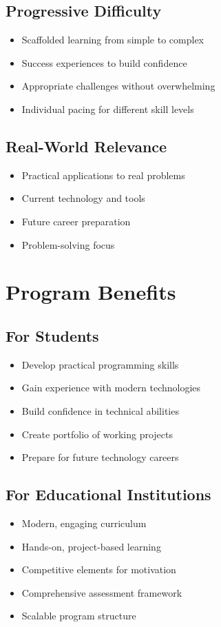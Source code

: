 \documentclass[12pt,a4paper]{article}
\begin{document}
\subsection{Progressive Difficulty}
\begin{itemize}
    \item Scaffolded learning from simple to complex
    \item Success experiences to build confidence
    \item Appropriate challenges without overwhelming
    \item Individual pacing for different skill levels
\end{itemize}

\subsection{Real-World Relevance}
\begin{itemize}
    \item Practical applications to real problems
    \item Current technology and tools
    \item Future career preparation
    \item Problem-solving focus
\end{itemize}

\section{Program Benefits}

\subsection{For Students}
\begin{itemize}
    \item Develop practical programming skills
    \item Gain experience with modern technologies
    \item Build confidence in technical abilities
    \item Create portfolio of working projects
    \item Prepare for future technology careers
\end{itemize}

\subsection{For Educational Institutions}
\begin{itemize}
    \item Modern, engaging curriculum
    \item Hands-on, project-based learning
    \item Competitive elements for motivation
    \item Comprehensive assessment framework
    \item Scalable program structure
\end{itemize}
\end{document}
